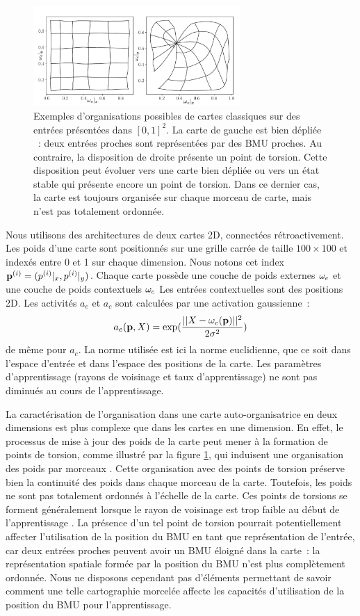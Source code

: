\documentclass[../main]{subfiles}
\begin{document}
\begin{figure}
	\centering\includegraphics[width=0.7\textwidth]{grid_torsion.pdf}
	\caption{Exemples d'organisations possibles de cartes classiques sur des entrées présentées dans $[0,1]^2$. 
	La carte de gauche est \og bien dépliée \fg{}~: deux entrées proches sont représentées par des BMU proches. 
	Au contraire, la disposition de droite présente un point de torsion. Cette disposition peut évoluer vers une carte bien dépliée ou vers un état stable qui présente encore un point de torsion. Dans ce dernier cas, la carte est toujours organisée sur chaque morceau de carte, mais n'est pas totalement ordonnée. \label{fig:torsion}
	}
\end{figure}

Nous utilisons des architectures de deux cartes 2D, connectées rétroactivement.
Les poids d'une carte sont positionnés sur une grille carrée de taille $100 \times 100$ et indexés entre 0 et 1 sur chaque dimension. Nous notons cet index $\mathbf{p}^{({i})} = (p^{({i})}|_x, p^{({i})}|_y)$.
Chaque carte possède une couche de poids externes $\omega_{e}$ et une couche de poids contextuels $\omega_c$
Les entrées contextuelles sont des positions 2D.
Les activités $a_e$ et $a_c$ sont calculées par une activation gaussienne~:
$$a_e(\mathbf{p},X) = \exp(\frac{||X - \omega_e(\mathbf{p}) ||^2}{2\sigma^2})$$
de même pour $a_c$.
La norme utilisée est ici la norme euclidienne, que ce soit dans l'espace d'entrée et dans l'espace des positions de la carte. Les paramètres d'apprentissage (rayons de voisinage et taux d'apprentissage) ne sont pas diminués au cours de l'apprentissage.

La caractérisation de l'organisation dans une carte auto-organisatrice en deux dimensions est plus complexe que dans les cartes en une dimension. En effet, le processus de mise à jour des poids de la carte peut mener à la formation de points de torsion, comme illustré par la figure \ref{fig:torsion}, qui induisent une organisation des poids \og par morceaux \fg{}.
Cette organisation avec des points de torsion préserve bien la continuité des poids dans chaque morceau de la carte. Toutefois, les poids ne sont pas totalement ordonnés à l'échelle de la carte. Ces points de torsions se forment généralement lorsque le rayon de voisinage est trop faible au début de l'apprentissage \parencite{Kohonen1995SelfOrganizingM}.
La présence d'un tel point de torsion pourrait potentiellement affecter l'utilisation de la position du BMU en tant que représentation de l'entrée, car deux entrées proches peuvent avoir un BMU éloigné dans la carte~: la représentation spatiale formée par la position du BMU n'est plus complètement ordonnée. 
Nous ne disposons cependant pas d'éléments permettant de savoir comment une telle cartographie morcelée affecte les capacités d'utilisation de la position du BMU pour l'apprentissage.
\end{document}
